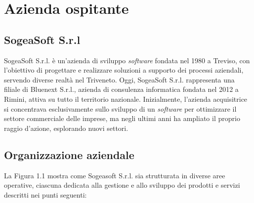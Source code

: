 \chapter{Azienda ospitante}
    \section{SogeaSoft S.r.l}
    SogeaSoft S.r.l. è un'azienda di sviluppo \textit{software} fondata nel 1980 a Treviso, con l'obiettivo di progettare e realizzare soluzioni a supporto dei processi aziendali, servendo diverse realtà nel Triveneto.
    Oggi, SogeaSoft S.r.l. rappresenta una filiale di Bluenext S.r.l., azienda di consulenza informatica fondata nel 2012 a Rimini, attiva su tutto il territorio nazionale. Inizialmente, l'azienda acquisitrice si concentrava esclusivamente sullo sviluppo di un \textit{software} per ottimizzare il settore commerciale delle imprese, ma negli ultimi anni ha ampliato il proprio raggio d'azione, esplorando nuovi settori.
    
    \section{Organizzazione aziendale}
    La Figura 1.1 mostra come Sogeasoft S.r.l. sia strutturata in diverse aree operative, ciascuna dedicata alla gestione e allo sviluppo dei prodotti e servizi descritti nei punti seguenti: 
    
